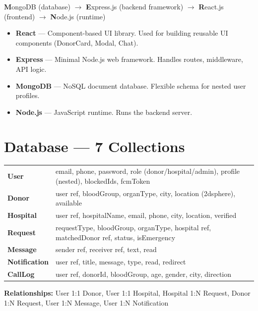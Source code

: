 \documentclass[10pt,a4paper]{article}
\begin{document}
\textbf{M}ongoDB (database) $\rightarrow$ \textbf{E}xpress.js (backend framework) $\rightarrow$ \textbf{R}eact.js (frontend) $\rightarrow$ \textbf{N}ode.js (runtime)

\begin{itemize}
    \item \textbf{React} --- Component-based UI library. Used for building reusable UI components (DonorCard, Modal, Chat).
    \item \textbf{Express} --- Minimal Node.js web framework. Handles routes, middleware, API logic.
    \item \textbf{MongoDB} --- NoSQL document database. Flexible schema for nested user profiles.
    \item \textbf{Node.js} --- JavaScript runtime. Runs the backend server.
\end{itemize}

\section{Database --- 7 Collections}

\begin{tabularx}{\textwidth}{@{}lX@{}}
\textbf{User} & email, phone, password, role (donor/hospital/admin), profile (nested), blockedIds, fcmToken \\
\textbf{Donor} & user ref, bloodGroup, organType, city, location (2dsphere), available \\
\textbf{Hospital} & user ref, hospitalName, email, phone, city, location, verified \\
\textbf{Request} & requestType, bloodGroup, organType, hospital ref, matchedDonor ref, status, isEmergency \\
\textbf{Message} & sender ref, receiver ref, text, read \\
\textbf{Notification} & user ref, title, message, type, read, redirect \\
\textbf{CallLog} & user ref, donorId, bloodGroup, age, gender, city, direction \\
\end{tabularx}

\textbf{Relationships:} User 1:1 Donor, User 1:1 Hospital, Hospital 1:N Request, Donor 1:N Request, User 1:N Message, User 1:N Notification

\end{document}
